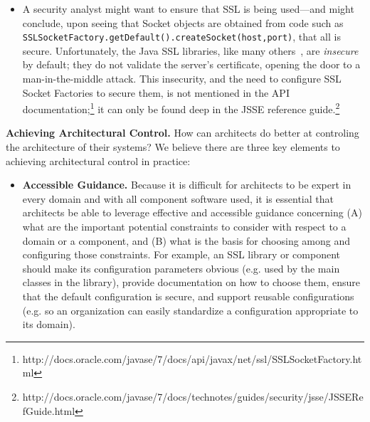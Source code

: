\documentclass[runningheads]{llncs}
\newcommand{\minisec}[1]{\vspace{2ex}\noindent\textbf{#1}}
\begin{document}
\begin{sloppypar}
\begin{itemize}
\item A security analyst might want to ensure that SSL is being used---and might conclude, upon seeing that Socket objects are obtained from code such as \texttt{SSLSocketFactory.getDefault().createSocket(host,port)}, that all is secure.  Unfortunately, the Java SSL libraries, like many others~\cite{GIJABS12}, are \emph{insecure} by default; they do not validate the server's certificate, opening the door to a man-in-the-middle attack.  This insecurity, and the need to configure SSL Socket Factories to secure them, is not mentioned in the API documentation;\footnote{http://docs.oracle.com/javase/7/docs/api/javax/net/ssl/SSLSocketFactory.html} it can only be found deep in the JSSE reference guide.\footnote{http://docs.oracle.com/javase/7/docs/technotes/guides/security/jsse/JSSERefGuide.html}

\end{itemize}


\minisec{Achieving Architectural Control.} How can architects do better at controling the architecture of their systems?  We believe there are three key elements to achieving architectural control in practice:

\begin{itemize}

\item \textbf{Accessible Guidance.}  Because it is difficult for architects to be expert in every domain and with all component software used, it is essential that architects be able to leverage effective and accessible guidance concerning (A) what are the important potential constraints to consider with respect to a domain or a component, and (B) what is the basis for choosing among and configuring those constraints.  For example, an SSL library or component should make its configuration parameters obvious (e.g. used by the main classes in the library), provide documentation on how to choose them, ensure that the default configuration is secure, and support reusable configurations (e.g. so an organization can easily standardize a configuration appropriate to its domain).


\end{itemize}
\end{sloppypar}
\end{document}
